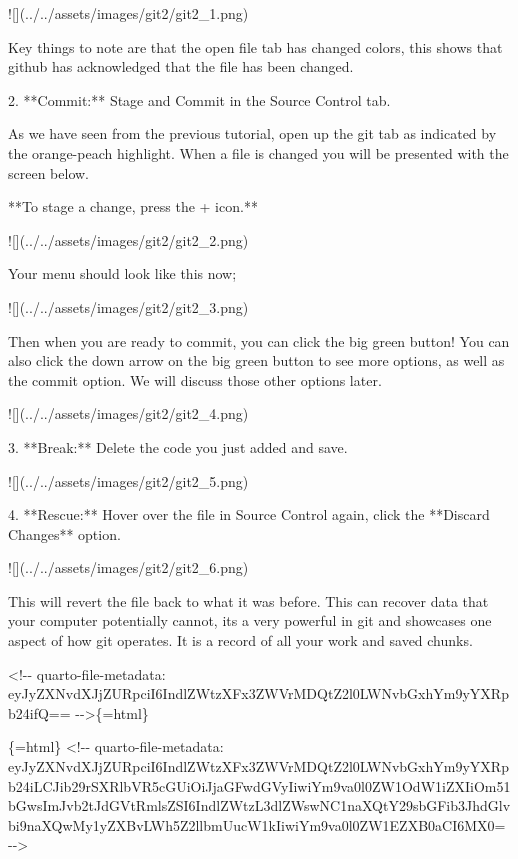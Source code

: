 \documentclass[
  letterpaper,
  DIV=11,
  numbers=noendperiod,
  oneside]{scrreprt}
\newenvironment{Shaded}{\begin{snugshade}}{\end{snugshade}}
\newcommand{\AlertTok}[1]{\textcolor[rgb]{0.68,0.00,0.00}{#1}}
\newcommand{\InformationTok}[1]{\textcolor[rgb]{0.37,0.37,0.37}{#1}}
\newcommand{\NormalTok}[1]{\textcolor[rgb]{0.00,0.23,0.31}{#1}}
\newcommand{\SpecialStringTok}[1]{\textcolor[rgb]{0.13,0.47,0.30}{#1}}
\begin{document}
\begin{Shaded}
\begin{Highlighting}[numbers=left,,]
    \AlertTok{![](../../assets/images/git2/git2\_1.png)}

\NormalTok{    Key things to note are that the open file tab has changed colors, this shows that github has acknowledged that the file has been changed.}

\SpecialStringTok{2.  }\NormalTok{**Commit:** Stage and Commit in the Source Control tab.}

\NormalTok{    As we have seen from the previous tutorial, open up the git tab as indicated by the orange{-}peach highlight. When a file is changed you will be presented with the screen below.}

\NormalTok{    **To stage a change, press the + icon.**}

    \AlertTok{![](../../assets/images/git2/git2\_2.png)}

\NormalTok{    Your menu should look like this now;}

    \AlertTok{![](../../assets/images/git2/git2\_3.png)}

\NormalTok{    Then when you are ready to commit, you can click the big green button! You can also click the down arrow on the big green button to see more options, as well as the commit option. We will discuss those other options later.}

    \AlertTok{![](../../assets/images/git2/git2\_4.png)}

\SpecialStringTok{3.  }\NormalTok{**Break:** Delete the code you just added and save.}

    \AlertTok{![](../../assets/images/git2/git2\_5.png)}

\SpecialStringTok{4.  }\NormalTok{**Rescue:** Hover over the file in Source Control again, click the **Discard Changes** option.}

    \AlertTok{![](../../assets/images/git2/git2\_6.png)}

\NormalTok{    This will revert the file back to what it was before. This can recover data that your computer potentially cannot, its a very powerful in git and showcases one aspect of how git operates. It is a record of all your work and saved chunks.}


\InformationTok{\textasciigrave{}\textless{}!{-}{-} quarto{-}file{-}metadata: eyJyZXNvdXJjZURpciI6IndlZWtzXFx3ZWVrMDQtZ2l0LWNvbGxhYm9yYXRpb24ifQ== {-}{-}\textgreater{}\textasciigrave{}}\NormalTok{\{=html\}}

\InformationTok{\textasciigrave{}\textasciigrave{}\textasciigrave{}\{=html\}}
\InformationTok{\textless{}!{-}{-} quarto{-}file{-}metadata: eyJyZXNvdXJjZURpciI6IndlZWtzXFx3ZWVrMDQtZ2l0LWNvbGxhYm9yYXRpb24iLCJib29rSXRlbVR5cGUiOiJjaGFwdGVyIiwiYm9va0l0ZW1OdW1iZXIiOm51bGwsImJvb2tJdGVtRmlsZSI6IndlZWtzL3dlZWswNC1naXQtY29sbGFib3JhdGlvbi9naXQwMy1yZXBvLWh5Z2llbmUucW1kIiwiYm9va0l0ZW1EZXB0aCI6MX0= {-}{-}\textgreater{}}
\InformationTok{\textasciigrave{}\textasciigrave{}\textasciigrave{}}


\end{Highlighting}
\end{Shaded}
\end{document}
